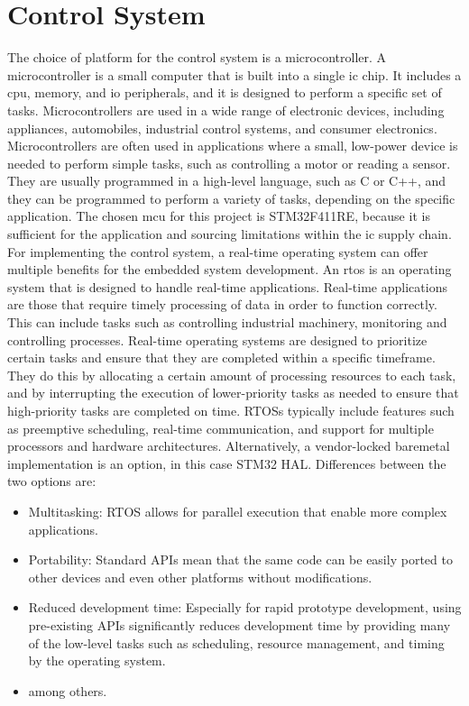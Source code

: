 \section{Control System}
The choice of platform for the control system is a microcontroller. A microcontroller is a small computer that is built into a single \gls{ic} chip. It includes a \gls{cpu}, memory, and \gls{io} peripherals, and it is designed to perform a specific set of tasks. Microcontrollers are used in a wide range of electronic devices, including appliances, automobiles, industrial control systems, and consumer electronics. Microcontrollers are often used in applications where a small, low-power device is needed to perform simple tasks, such as controlling a motor or reading a sensor. They are usually programmed in a high-level language, such as C or C++, and they can be programmed to perform a variety of tasks, depending on the specific application. The chosen \gls{mcu} for this project is STM32F411RE, because it is sufficient for the application and sourcing limitations within the \gls{ic} supply chain. For implementing the control system, a real-time operating system can offer multiple benefits for the embedded system development. An \gls{rtos} is an operating system that is designed to handle real-time applications. Real-time applications are those that require timely processing of data in order to function correctly. This can include tasks such as controlling industrial machinery, monitoring and controlling processes. Real-time operating systems are designed to prioritize certain tasks and ensure that they are completed within a specific timeframe. They do this by allocating a certain amount of processing resources to each task, and by interrupting the execution of lower-priority tasks as needed to ensure that high-priority tasks are completed on time. RTOSs typically include features such as preemptive scheduling, real-time communication, and support for multiple processors and hardware architectures. Alternatively, a vendor-locked baremetal implementation is an option, in this case STM32 HAL. Differences between the two options are:
\begin{itemize}
	\item Multitasking: RTOS allows for parallel execution that enable more complex applications.
	\item Portability: Standard APIs mean that the same code can be easily ported to other devices and even other platforms without modifications.
	\item Reduced development time: Especially for rapid prototype development, using pre-existing APIs significantly reduces development time by providing many of the low-level tasks such as scheduling, resource management, and timing by the operating system.
	\item among others.
\end{itemize}

